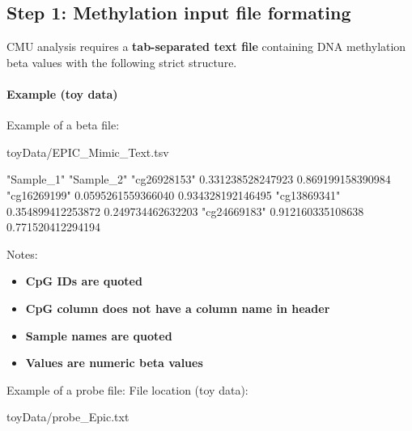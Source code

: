 \documentclass[
]{article}
\newenvironment{Shaded}{\begin{snugshade}}{\end{snugshade}}
\newcommand{\NormalTok}[1]{#1}
\providecommand{\tightlist}{%
  \setlength{\itemsep}{0pt}\setlength{\parskip}{0pt}}
\begin{document}
\subsection{Step 1: Methylation input file
formating}\label{methylation-input-format}

CMU analysis requires a \textbf{tab-separated text file} containing DNA
methylation beta values with the following strict structure.

\paragraph{Example (toy data)}\label{example-toy-data}

Example of a beta file:

\begin{Shaded}
\begin{Highlighting}[]
\NormalTok{toyData/EPIC\_Mimic\_Text.tsv}
\end{Highlighting}
\end{Shaded}

\begin{Shaded}
\begin{Highlighting}[]
\NormalTok{"Sample\_1"    "Sample\_2"   }
\NormalTok{"cg26928153"  0.331238528247923   0.869199158390984}
\NormalTok{"cg16269199"  0.0595261559366040  0.934328192146495}
\NormalTok{"cg13869341"  0.354899412253872   0.249734462632203}
\NormalTok{"cg24669183"  0.912160335108638   0.771520412294194}
\end{Highlighting}
\end{Shaded}

Notes:

\begin{itemize}
\tightlist
\item
  \textbf{CpG IDs are quoted}
\item
  \textbf{CpG column does not have a column name in header}
\item
  \textbf{Sample names are quoted}
\item
  \textbf{Values are numeric beta values}
\end{itemize}

Example of a probe file: File location (toy data):

\begin{Shaded}
\begin{Highlighting}[]
\NormalTok{toyData/probe\_Epic.txt}
\end{Highlighting}
\end{Shaded}
\end{document}
